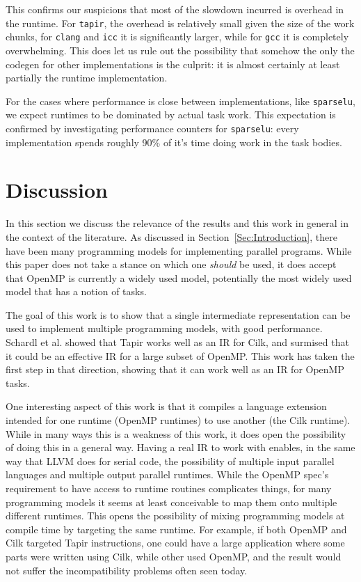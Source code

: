 \documentclass[sigconf]{acmart}
\begin{document}
This confirms our suspicions that most of the slowdown incurred is overhead in
the runtime. For \texttt{tapir}, the overhead is relatively small given the
size of the work chunks, for \texttt{clang} and \texttt{icc} it is
significantly larger, while for \texttt{gcc} it is completely overwhelming.
This does let us rule out the possibility that somehow the only the codegen for
other implementations is the culprit: it is almost certainly at least partially
the runtime implementation.  

For the cases where performance is close between implementations, like
\texttt{sparselu}, we expect runtimes to be dominated by actual task work. This 
expectation is confirmed by investigating performance counters for \texttt{sparselu}:
every implementation spends roughly 90\% of it's time doing work in the task
bodies. 

\section{Discussion} \label{Sec:Discussion}

In this section we discuss the relevance of the results and this work in general
in the context of the literature. As discussed in Section~\ref{Sec:Introduction}, 
there have been many programming models for implementing parallel programs. While
this paper does not take a stance on which one \emph{should} be used, it does
accept that OpenMP is currently a widely used model, potentially the most
widely used model that has a notion of tasks. 

The goal of this work is to show that a single intermediate representation can be
used to implement multiple programming models, with good performance. Schardl et 
al. showed that Tapir works well as an IR for Cilk, and surmised that it could
be an effective IR for a large subset of OpenMP. This work has taken the first
step in that direction, showing that it can work well as an IR for OpenMP tasks. 

One interesting aspect of this work is that it compiles a language extension intended
for one runtime (OpenMP runtimes) to use another (the Cilk runtime). While in many
ways this is a weakness of this work, it does open the possibility of doing this 
in a general way. Having a real IR to work with enables, in the same way that LLVM
does for serial code, the possibility of multiple input parallel languages and
multiple output parallel runtimes. While the OpenMP spec's requirement to
have access to runtime routines complicates things, for many programming models
it seems at least conceivable to map them onto multiple different runtimes. This
opens the possibility of mixing programming models at compile time by targeting
the same runtime. For example, if both OpenMP and Cilk targeted Tapir
instructions, one could have a large application where some parts were written
using Cilk, while other used OpenMP, and the result would not suffer the
incompatibility problems often seen today. 
\end{document}
